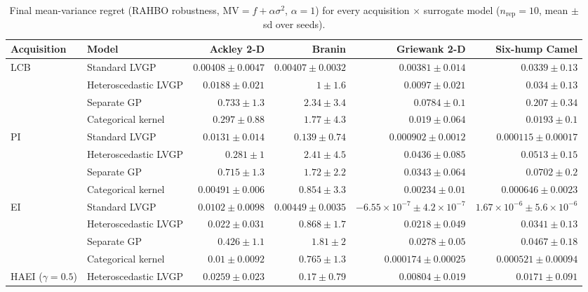 \begin{table}[htbp]
\centering
\small
\setlength{\tabcolsep}{4pt}
\setlength{\fboxsep}{2pt}
\caption{Final mean-variance regret (RAHBO robustness, $\mathrm{MV}=f+\alpha\sigma^2$, $\alpha=1$) for every acquisition $\times$ surrogate model ($n_{\mathrm{rep}}=10$, mean $\pm$ sd over seeds).}
\label{tab:mv_nrep10}
\begin{tabular}{llrrrr}
\toprule
Acquisition & Model & Ackley 2-D & Branin & Griewank 2-D & Six-hump Camel \\
\midrule
LCB & Standard LVGP & \colorbox{green!20}{{\boldmath$0.00408 \pm 0.0047$}} & {\boldmath$0.00407 \pm 0.0032$} & {\boldmath$0.00381 \pm 0.014$} & $0.0339 \pm 0.13$ \\
 & Heteroscedastic LVGP & $0.0188 \pm 0.021$ & $1 \pm 1.6$ & $0.0097 \pm 0.021$ & $0.034 \pm 0.13$ \\
 & Separate GP & $0.733 \pm 1.3$ & $2.34 \pm 3.4$ & $0.0784 \pm 0.1$ & $0.207 \pm 0.34$ \\
 & Categorical kernel & $0.297 \pm 0.88$ & $1.77 \pm 4.3$ & $0.019 \pm 0.064$ & {\boldmath$0.0193 \pm 0.1$} \\
\midrule
PI & Standard LVGP & $0.0131 \pm 0.014$ & {\boldmath$0.139 \pm 0.74$} & {\boldmath$0.000902 \pm 0.0012$} & {\boldmath$0.000115 \pm 0.00017$} \\
 & Heteroscedastic LVGP & $0.281 \pm 1$ & $2.41 \pm 4.5$ & $0.0436 \pm 0.085$ & $0.0513 \pm 0.15$ \\
 & Separate GP & $0.715 \pm 1.3$ & $1.72 \pm 2.2$ & $0.0343 \pm 0.064$ & $0.0702 \pm 0.2$ \\
 & Categorical kernel & {\boldmath$0.00491 \pm 0.006$} & $0.854 \pm 3.3$ & $0.00234 \pm 0.01$ & $0.000646 \pm 0.0023$ \\
\midrule
EI & Standard LVGP & $0.0102 \pm 0.0098$ & {\boldmath$0.00449 \pm 0.0035$} & \colorbox{green!20}{{\boldmath$-6.55{\times}10^{-7} \pm 4.2{\times}10^{-7}$}} & \colorbox{green!20}{{\boldmath$1.67{\times}10^{-6} \pm 5.6{\times}10^{-6}$}} \\
 & Heteroscedastic LVGP & $0.022 \pm 0.031$ & $0.868 \pm 1.7$ & $0.0218 \pm 0.049$ & $0.0341 \pm 0.13$ \\
 & Separate GP & $0.426 \pm 1.1$ & $1.81 \pm 2$ & $0.0278 \pm 0.05$ & $0.0467 \pm 0.18$ \\
 & Categorical kernel & {\boldmath$0.01 \pm 0.0092$} & $0.765 \pm 1.3$ & $0.000174 \pm 0.00025$ & $0.000521 \pm 0.00094$ \\
\midrule
HAEI ($\gamma=0.5$) & Heteroscedastic LVGP & $0.0259 \pm 0.023$ & $0.17 \pm 0.79$ & {\boldmath$0.00804 \pm 0.019$} & $0.0171 \pm 0.091$ \\

\end{tabular}
\end{table}
